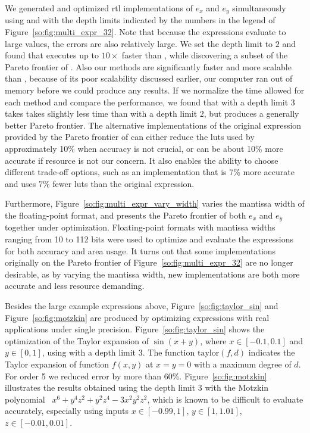 We generated and optimized \gls{rtl} implementations of $e_x$ and
$e_y$ simultaneously using \frontiertrace{} and \greedytrace{}
with the depth limits indicated by the numbers in the legend of
Figure~\ref{so:fig:multi_expr_32}. Note that because the expressions evaluate
to large values, the errors are also relatively large. We set the depth
limit to $2$ and found that \greedytrace{} executes up to $10\times$ faster
than \frontiertrace{}, while discovering a subset of the Pareto frontier of
\frontiertrace{}. Also our methods are significantly faster and more scalable
than \marteltrace{}, because of its poor scalability discussed earlier, our
computer ran out of memory before we could produce any results. If we normalize
the time allowed for each method and compare the performance, we found that
\greedytrace{} with a depth limit $3$ takes takes slightly less time than
\frontiertrace{} with a depth limit $2$, but produces a generally better Pareto
frontier. The alternative implementations of the original expression provided
by the Pareto frontier of \greedytrace{} can either reduce the \glspl{lut}
used by approximately 10\% when accuracy is not crucial, or can be about 10\%
more accurate if resource is not our concern.  It also enables the ability to
choose different trade-off options, such as an implementation that is 7\% more
accurate and uses 7\% fewer \glspl{lut} than the original expression.

Furthermore, Figure~\ref{so:fig:multi_expr_vary_width} varies the mantissa
width of the floating-point format, and presents the Pareto frontier
of both $e_x$ and $e_y$ together under optimization. Floating-point
formats with mantissa widths ranging from 10 to 112 bits were used to
optimize and evaluate the expressions for both accuracy and area usage. It
turns out that some implementations originally on the Pareto frontier of
Figure~\ref{so:fig:multi_expr_32} are no longer desirable, as by varying the
mantissa width, new implementations are both more accurate and less resource
demanding.

Besides the large example expressions above, Figure~\ref{so:fig:taylor_sin}
and Figure~\ref{so:fig:motzkin} are produced by optimizing expressions with
real applications under single precision. Figure~\ref{so:fig:taylor_sin} shows
the optimization of the Taylor expansion of $\sin(x + y)$, where $x\in[-0.1,
0.1]$ and $y\in[0, 1]$, using \greedytrace{} with a depth limit $3$. The
function $\mathrm{taylor}(f, d)$ indicates the Taylor expansion of function
$f(x, y)$ at $x = y = 0$ with a maximum degree of $d$. For order 5 we reduced
error by more than 60\%. Figure~\ref{so:fig:motzkin} illustrates the results
obtained using the depth limit $3$ with the Motzkin polynomial~\cite{demmel}
$x^6 + y^4 z^2 + y^2 z^4 - 3 x^2 y^2 z^2$, which is known to be difficult to
evaluate accurately, especially using inputs $x\in[-0.99, 1]$, $y\in[1, 1.01]$,
$z\in[-0.01, 0.01]$.

